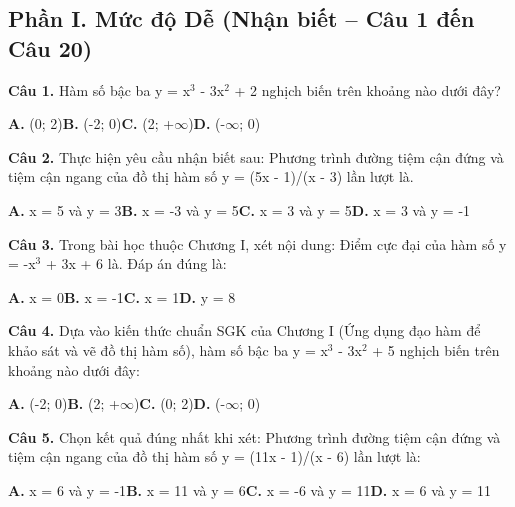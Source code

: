 \documentclass[11pt,a4paper]{article}
\begin{document}
\subsection*{\color{accent} Phần I. Mức độ Dễ (Nhận biết -- Câu 1 đến Câu 20)}
\textbf{\color{primary} Câu 1.} Hàm số bậc ba y = x$^3$ - 3x$^2$ + 2 nghịch biến trên khoảng nào dưới đây?\par
\hspace*{1.5em}\textbf{A.} (0; 2)\quad\quad \textbf{B.} (-2; 0)\quad\quad \textbf{C.} (2; +$\infty$)\quad\quad \textbf{D.} (-$\infty$; 0)\par\vspace{2pt}
\textbf{\color{primary} Câu 2.} Thực hiện yêu cầu nhận biết sau: Phương trình đường tiệm cận đứng và tiệm cận ngang của đồ thị hàm số y = (5x - 1)/(x - 3) lần lượt là.\par
\hspace*{1.5em}\textbf{A.} x = 5 và y = 3\quad\quad \textbf{B.} x = -3 và y = 5\quad\quad \textbf{C.} x = 3 và y = 5\quad\quad \textbf{D.} x = 3 và y = -1\par\vspace{2pt}
\textbf{\color{primary} Câu 3.} Trong bài học thuộc Chương I, xét nội dung: Điểm cực đại của hàm số y = -x$^3$ + 3x + 6 là. Đáp án đúng là:\par
\hspace*{1.5em}\textbf{A.} x = 0\quad\quad \textbf{B.} x = -1\quad\quad \textbf{C.} x = 1\quad\quad \textbf{D.} y = 8\par\vspace{2pt}
\textbf{\color{primary} Câu 4.} Dựa vào kiến thức chuẩn SGK của Chương I (Ứng dụng đạo hàm để khảo sát và vẽ đồ thị hàm số), hàm số bậc ba y = x$^3$ - 3x$^2$ + 5 nghịch biến trên khoảng nào dưới đây:\par
\hspace*{1.5em}\textbf{A.} (-2; 0)\quad\quad \textbf{B.} (2; +$\infty$)\quad\quad \textbf{C.} (0; 2)\quad\quad \textbf{D.} (-$\infty$; 0)\par\vspace{2pt}
\textbf{\color{primary} Câu 5.} Chọn kết quả đúng nhất khi xét: Phương trình đường tiệm cận đứng và tiệm cận ngang của đồ thị hàm số y = (11x - 1)/(x - 6) lần lượt là:\par
\hspace*{1.5em}\textbf{A.} x = 6 và y = -1\quad\quad \textbf{B.} x = 11 và y = 6\quad\quad \textbf{C.} x = -6 và y = 11\quad\quad \textbf{D.} x = 6 và y = 11\par\vspace{2pt}
\end{document}
